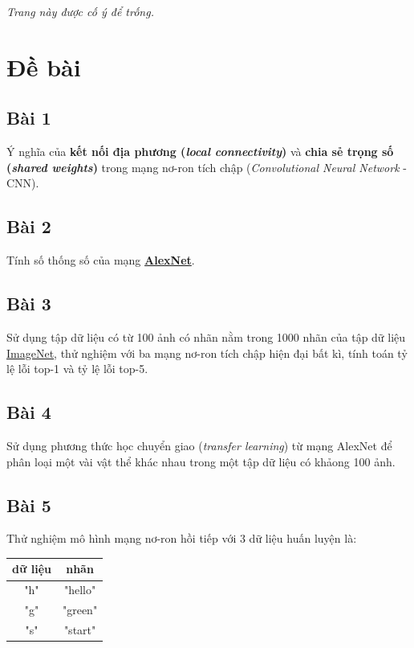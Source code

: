 \documentclass[a4paper]{article}
\begin{document}
\newpage
\tableofcontents
\newpage
\vspace*{\fill}
{\centering \textit{Trang này được cố ý để trống.}\par}
\vspace{\fill}
\newpage

\section{Đề bài}

\subsection{Bài 1} Ý nghĩa của \textbf{kết nối địa phương (\textit{local connectivity})} và \textbf{chia sẻ trọng số (\textit{shared weights})} trong mạng nơ-ron tích chập (\textit{Convolutional Neural Network} - CNN).
\subsection{Bài 2} Tính số thống số của mạng \href{https://en.wikipedia.org/wiki/AlexNet}{\textbf{AlexNet}}.
\subsection{Bài 3} Sử dụng tập dữ liệu có từ 100 ảnh có nhãn nằm trong 1000 nhãn của tập dữ liệu \href{http://www.image-net.org/download}{ImageNet}, thử nghiệm với ba mạng nơ-ron tích chập hiện đại bất kì, tính toán tỷ lệ lỗi top-1 và tỷ lệ lỗi top-5.
\subsection{Bài 4} Sử dụng phương thức học chuyển giao (\textit{transfer learning}) từ mạng AlexNet để phân loại một vài vật thể khác nhau trong một tập dữ liệu có khảong 100 ảnh.
\subsection{Bài 5} Thử nghiệm mô hình mạng nơ-ron hồi tiếp với 3 dữ liệu huấn luyện là:
\begin{table}[!h]
\centering
{\renewcommand{\arraystretch}{1.8}
\begin{tabular}{|c|c|}
\hline
\textbf{dữ liệu} & \textbf{nhãn} \\ \hline
"h"              & "hello"       \\ \hline
"g"              & "green"       \\ \hline
"s"              & "start"       \\ \hline
\end{tabular}}
\end{table}
\end{document}
